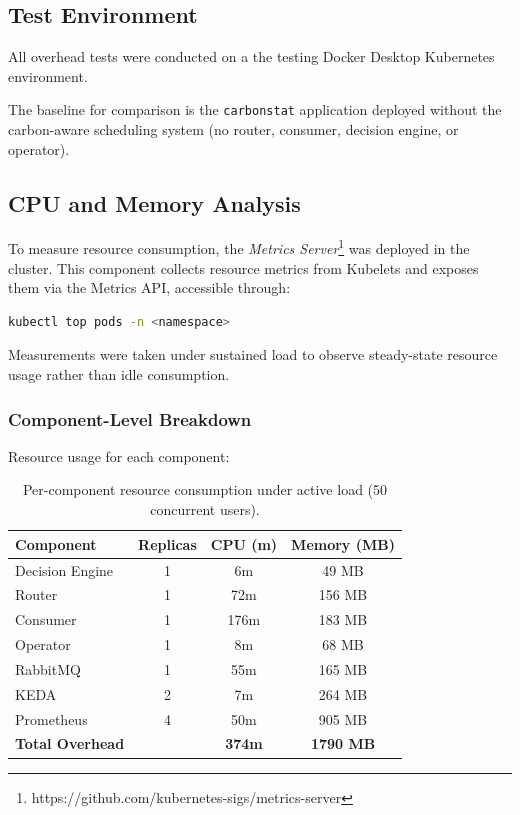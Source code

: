 \subsection{Test Environment}

All overhead tests were conducted on a the testing Docker Desktop Kubernetes environment.

The baseline for comparison is the \texttt{carbonstat} application deployed without the carbon-aware scheduling system (no router, consumer, decision engine, or operator).

\subsection{CPU and Memory Analysis}

To measure resource consumption, the \textit{Metrics Server}\footnote{https://github.com/kubernetes-sigs/metrics-server} was deployed in the cluster. This component collects resource metrics from Kubelets and exposes them via the Metrics API, accessible through:

\begin{lstlisting}[language=bash,caption={Collecting pod resource metrics.},label=lst:kubectl-top]
kubectl top pods -n <namespace>
\end{lstlisting}

Measurements were taken under sustained load to observe steady-state resource usage rather than idle consumption.

\subsubsection{Component-Level Breakdown}

Resource usage for each component:

\begin{table}[h]
\centering
\begin{tabular}{|l|c|c|c|}
\hline
\rowcolor{lightgray}
\textbf{Component} & \textbf{Replicas} & \textbf{CPU (m)} & \textbf{Memory (MB)} \\
\hline
Decision Engine & 1 & 6m & 49 MB \\
\hline
Router & 1 & 72m & 156 MB \\
\hline
Consumer & 1 & 176m & 183 MB \\
\hline
Operator & 1 & 8m & 68 MB \\
\hline
RabbitMQ & 1 & 55m & 165 MB \\
\hline
KEDA & 2 & 7m & 264 MB \\
\hline
Prometheus & 4 & 50m & 905 MB \\
\hline
\rowcolor{lightgray}
\textbf{Total Overhead} & & \textbf{374m} & \textbf{1790 MB} \\
\hline
\end{tabular}
\caption{Per-component resource consumption under active load (50 concurrent users).}
\label{table:component-resources}
\end{table}

